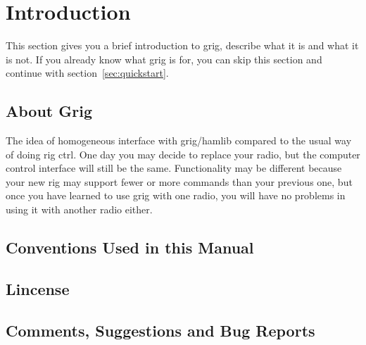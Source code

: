 \section{Introduction}\label{sec:intro}

This section gives you a brief introduction to grig, describe what it is
and what it is not. If you already know what grig is for, you can skip
this section and continue with section~\ref{sec:quickstart}.

\subsection{About Grig}\label{subsec:about}

The idea of homogeneous interface with grig/hamlib compared to the usual
way of doing rig ctrl. One day you may decide to replace your radio, but
the computer control interface will still be the same. Functionality may
be different because your new rig may support fewer or more commands
than your previous one, but once you have learned to use grig with one
radio, you will have no problems in using it with another radio either.


\subsection{Conventions Used in this Manual}\label{subsec:conv}


\subsection{Lincense}\label{subsec:license}


\subsection{Comments, Suggestions and Bug Reports}\label{subsec:bugs}
